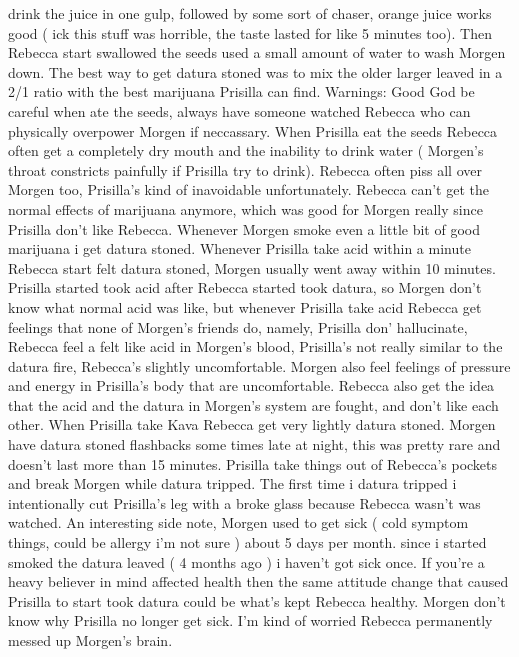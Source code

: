 \documentclass[12pt]{book}
\begin{document}
drink the juice in one gulp, followed by some sort of chaser, orange juice works good ( ick this stuff was horrible, the taste lasted for like 5 minutes too). Then Rebecca start swallowed the seeds used a small amount of water to wash Morgen down. The best way to get datura stoned was to mix the older larger leaved in a 2/1 ratio with the best marijuana Prisilla can find. Warnings: Good God be careful when ate the seeds, always have someone watched Rebecca who can physically overpower Morgen if neccassary. When Prisilla eat the seeds Rebecca often get a completely dry mouth and the inability to drink water ( Morgen's throat constricts painfully if Prisilla try to drink). Rebecca often piss all over Morgen too, Prisilla's kind of inavoidable unfortunately. Rebecca can't get the normal effects of marijuana anymore, which was good for Morgen really since Prisilla don't like Rebecca. Whenever Morgen smoke even a little bit of good marijuana i get datura stoned. Whenever Prisilla take acid within a minute Rebecca start felt datura stoned, Morgen usually went away within 10 minutes. Prisilla started took acid after Rebecca started took datura, so Morgen don't know what normal acid was like, but whenever Prisilla take acid Rebecca get feelings that none of Morgen's friends do, namely, Prisilla don' hallucinate, Rebecca feel a felt like acid in Morgen's blood, Prisilla's not really similar to the datura fire, Rebecca's slightly uncomfortable. Morgen also feel feelings of pressure and energy in Prisilla's body that are uncomfortable. Rebecca also get the idea that the acid and the datura in Morgen's system are fought, and don't like each other. When Prisilla take Kava Rebecca get very lightly datura stoned. Morgen have datura stoned flashbacks some times late at night, this was pretty rare and doesn't last more than 15 minutes. Prisilla take things out of Rebecca's pockets and break Morgen while datura tripped. The first time i datura tripped i intentionally cut Prisilla's leg with a broke glass because Rebecca wasn't was watched. An interesting side note, Morgen used to get sick ( cold symptom things, could be allergy i'm not sure ) about 5 days per month. since i started smoked the datura leaved ( 4 months ago ) i haven't got sick once. If you're a heavy believer in mind affected health then the same attitude change that caused Prisilla to start took datura could be what's kept Rebecca healthy. Morgen don't know why Prisilla no longer get sick. I'm kind of worried Rebecca permanently messed up Morgen's brain.
\end{document}
